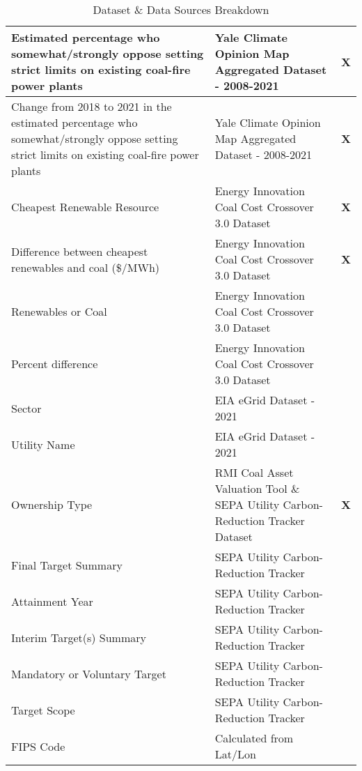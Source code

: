 \begin{table}[htb]
\begin{adjustbox}{width=\textwidth}
\begin{tabular}{|l | l | l |}
        \midrule
        Estimated percentage who somewhat/strongly oppose setting strict limits on existing coal-fire power plants & Yale Climate Opinion Map Aggregated Dataset - 2008-2021 & \textbf{X} \\
        \midrule
        Change from 2018 to 2021 in the estimated percentage who somewhat/strongly oppose setting strict limits on existing coal-fire power plants & Yale Climate Opinion Map Aggregated Dataset - 2008-2021 & \textbf{X} \\
        \midrule
        Cheapest Renewable Resource & Energy Innovation Coal Cost Crossover 3.0 Dataset & \textbf{X} \\
        \midrule
        Difference between cheapest renewables and coal (\$/MWh) & Energy Innovation Coal Cost Crossover 3.0 Dataset & \textbf{X} \\
        \midrule
        Renewables or Coal & Energy Innovation Coal Cost Crossover 3.0 Dataset & \\
        \midrule
        Percent difference & Energy Innovation Coal Cost Crossover 3.0 Dataset & \\
        \midrule
        Sector & EIA eGrid Dataset - 2021 & \\
        \midrule
        Utility Name & EIA eGrid Dataset - 2021 & \ \\
        \midrule
        Ownership Type & RMI Coal Asset Valuation Tool \& SEPA Utility Carbon-Reduction Tracker Dataset & \textbf{X} \\
        \midrule
        Final Target Summary & SEPA Utility Carbon-Reduction Tracker & \\
        \midrule
        Attainment Year & SEPA Utility Carbon-Reduction Tracker & \\
        \midrule
        Interim Target(s) Summary & SEPA Utility Carbon-Reduction Tracker & \\
        \midrule
        Mandatory or Voluntary Target & SEPA Utility Carbon-Reduction Tracker & \\
        \midrule
        Target Scope & SEPA Utility Carbon-Reduction Tracker & \\
        \midrule
        FIPS Code & Calculated from Lat/Lon\\
        \bottomrule
      \end{tabular}
    \end{adjustbox}
    \caption{Dataset \& Data Sources Breakdown}
  \end{table}




